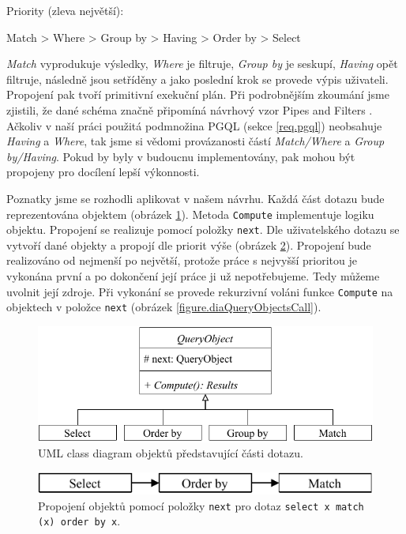 Priority (zleva největší):
\begin{code}
      Match > Where > Group by > Having > Order by > Select 
\end{code}
\textit{Match} vyprodukuje výsledky, \textit{Where} je filtruje, \textit{Group by} je seskupí, \textit{Having} opět filtruje, následně jsou setříděny a jako poslední krok se provede výpis uživateli.
Propojení pak tvoří primitivní exekuční plán.
Při podrobnějším zkoumání jsme zjistili, že dané schéma značně připomíná návrhový vzor Pipes and Filters \citep[str. 53]{patterns2}.
Ačkoliv v naší práci použitá podmnožina PGQL (sekce \ref{req.pgql}) neobsahuje \textit{Having} a \textit{Where}, tak jsme si vědomi provázanosti částí \textit{Match/Where} a \textit{Group by/Having}.
Pokud by byly v budoucnu implementovány, pak mohou být propojeny pro docílení lepší výkonnosti. 

Poznatky jsme se rozhodli aplikovat v našem návrhu.
Každá část dotazu bude reprezentována objektem (obrázek \ref{figure.diaQueryObjects}).
Metoda \verb+Compute+ implementuje logiku objektu.
Propojení se realizuje pomocí položky \verb+next+.
Dle uživatelského dotazu se vytvoří dané objekty a propojí dle priorit výše (obrázek \ref{figure.diaQueryObjectsCon}).
Propojení bude realizováno od nejmenší po největší, protože práce s nejvyšší prioritou je vykonána první a po dokončení její práce ji už nepotřebujeme.
Tedy můžeme uvolnit její zdroje.
Při vykonání se provede rekurzivní voláni funkce \texttt{Compute} na objektech v položce \verb+next+ (obrázek \ref{figure.diaQueryObjectsCall}). 

\begin{figure}[!htp]
\includegraphics{../img/diaQueryObjects.pdf}\centering
\caption{UML class diagram objektů představující části dotazu.}
\label{figure.diaQueryObjects}
\end{figure}

\clearpage

\begin{figure}[!htp]
\includegraphics{../img/diaQueryObjectsCon.pdf}\centering
\caption{Propojení objektů pomocí položky \texttt{next} pro dotaz \texttt{select x match (x) order by x}.}
\label{figure.diaQueryObjectsCon}
\end{figure}


